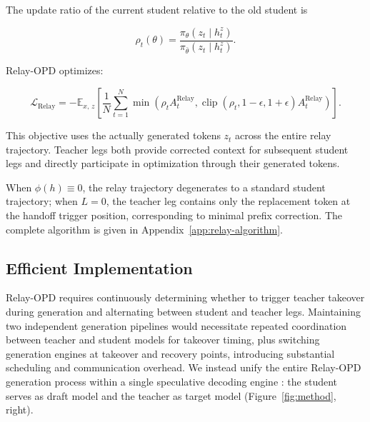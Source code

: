\documentclass{article} %
\begin{document}
The update ratio of the current student relative to the old student is\par

\begin{equation}
\rho_t(\theta)
=\frac{\pi_\theta(z_t\mid h_t^z)}
{\pi_{\bar\theta}(z_t\mid h_t^z)}.
\end{equation}

Relay-OPD optimizes:\par

\begin{equation}
\mathcal L_{\mathrm{Relay}}
=-\mathbb E_{x,\,z}
\left[
\frac{1}{N}\sum_{t=1}^{N}
\min\left(
\rho_tA_t^{\mathrm{Relay}},
\operatorname{clip}(\rho_t,1-\epsilon,1+\epsilon)A_t^{\mathrm{Relay}}
\right)
\right].
\end{equation}

This objective uses the actually generated tokens $z_t$ across the entire relay trajectory. Teacher legs both provide corrected context for subsequent student legs and directly participate in optimization through their generated tokens.\par

When $\phi(h)\equiv0$, the relay trajectory degenerates to a standard student trajectory; when $L=0$, the teacher leg contains only the replacement token at the handoff trigger position, corresponding to minimal prefix correction. The complete algorithm is given in Appendix~\ref{app:relay-algorithm}.\par

\subsection{Efficient Implementation}\label{subsec:implementation}

Relay-OPD requires continuously determining whether to trigger teacher takeover during generation and alternating between student and teacher legs. Maintaining two independent generation pipelines would necessitate repeated coordination between teacher and student models for takeover timing, plus switching generation engines at takeover and recovery points, introducing substantial scheduling and communication overhead. We instead unify the entire Relay-OPD generation process within a single speculative decoding engine \citep{leviathan2023fast,chen2023accelerating}: the student serves as draft model and the teacher as target model (Figure~\ref{fig:method}, right).\par
\end{document}

